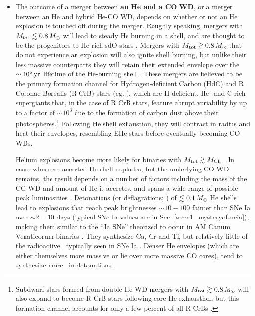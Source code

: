 \begin{itemize}
	\item The outcome of a merger between {\bf an He and a CO WD}, or a merger between an He and hybrid He-CO WD, depends on whether or not an He explosion is touched off during the merger.  Roughly speaking, mergers with $\Mtot \lesssim 0.8\,\Msun$ will lead to steady He burning in a shell, and are thought to be the progenitors to He-rich sdO stars \citep{justph11}.  Mergers with $\Mtot \gtrsim 0.8\,\Msun$ that do not experience an explosion will also ignite shell burning, but unlike their less massive counterparts they will retain their extended envelope over the $\sim10^5\,\mathrm{yr}$ lifetime of the He-burning shell \citep{ibent85, zhanj12b}.  These mergers are believed to be the primary formation channel for Hydrogen-deficient Carbon (HdC) and R Coronae Borealis (R CrB) stars (eg. \citealt{webb84, ibent84, saioj02, clay12, zhan+14}), which are H-deficient, He- and C-rich supergiants that, in the case of R CrB stars, feature abrupt variability by up to a factor of $\sim10^3$ due to the formation of carbon dust above their photospheres.\footnote{Subdwarf stars formed from double He WD mergers with $\Mtot \gtrsim 0.8\,\Msun$ will also expand to become R CrB stars following core He exhaustion, but this formation channel accounts for only a few percent of all R CrBs \citep{zhanj12b}.}  Following He shell exhaustion, they will contract in radius and heat their envelopes, resembling EHe stars \citep{saioj02, jeff14} before eventually becoming CO WDs.

Helium explosions become more likely for binaries with $\Mtot\gtrsim\Mch$ \citep{dan+12, dan+14}.  In cases where an accreted He shell explodes, but the underlying CO WD remains, the result depends on a number of factors including the mass of the CO WD and amount of He it accretes, and spans a wide range of possible peak luminosities \citep{shen+10he, wald+11, woosk11}.  Detonations (or deflagrations; \citealt{woosk11}) of $\lesssim0.1\,\Msun$ He shells lead to explosions that reach peak brightnesses $\sim10-100$ fainter than SNe Ia over $\sim2-10$ days (typical SNe Ia values are in Sec. \ref{sec:c1_mysteryofsneia}), making them similar to the ``.Ia SNe'' theorized to occur in AM Canum Venaticorum binaries \citep{bild+07}.  They synthesize Ca, Cr and Ti, but relatively little of the radioactive \Ni\ typically seen in SNe Ia \citep{shen+10he, woosk11, wald+11}.  Denser He envelopes (which are either themselves more massive or lie over more massive CO cores), tend to synthesize more \Ni\ in detonations \citep{shen+10he, wald+11}. 


\end{itemize}
